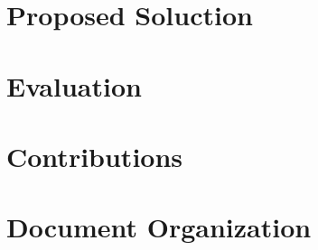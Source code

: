 \section{Proposed Soluction}


\section{Evaluation}

\section{Contributions}

\section{Document Organization}